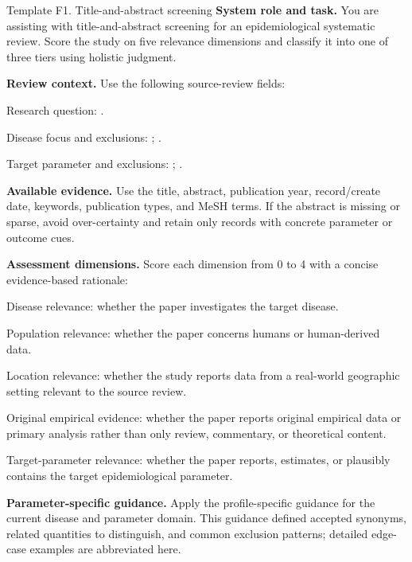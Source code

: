 \begin{prompttemplate}{Template F1. Title-and-abstract screening}
\textbf{System role and task.} You are assisting with title-and-abstract screening for an epidemiological systematic review. Score the study on five relevance dimensions and classify it into one of three tiers using holistic judgment.

\textbf{Review context.} Use the following source-review fields:
\begin{promptitems}
  \item Research question: .
  \item Disease focus and exclusions: ; .
  \item Target parameter and exclusions: ; .
\end{promptitems}

\textbf{Available evidence.} Use the title, abstract, publication year, record/create date, keywords, publication types, and MeSH terms. If the abstract is missing or sparse, avoid over-certainty and retain only records with concrete parameter or outcome cues.

\textbf{Assessment dimensions.} Score each dimension from 0 to 4 with a concise evidence-based rationale:
\begin{promptitems}
  \item Disease relevance: whether the paper investigates the target disease.
  \item Population relevance: whether the paper concerns humans or human-derived data.
  \item Location relevance: whether the study reports data from a real-world geographic setting relevant to the source review.
  \item Original empirical evidence: whether the paper reports original empirical data or primary analysis rather than only review, commentary, or theoretical content.
  \item Target-parameter relevance: whether the paper reports, estimates, or plausibly contains the target epidemiological parameter.
\end{promptitems}

\textbf{Parameter-specific guidance.} Apply the profile-specific guidance for the current disease and parameter domain. This guidance defined accepted synonyms, related quantities to distinguish, and common exclusion patterns; detailed edge-case examples are abbreviated here.


\end{prompttemplate}
